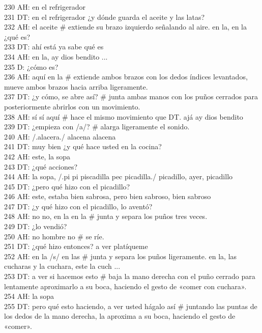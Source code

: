 230 AH: en el refrigerador\\
231 DT: en el refrigerador ¿y dónde guarda el aceite y las latas?\\
232 AH: el aceite \# extiende su brazo izquierdo señalando al aire. en la, en la ¿qué es?\\
233 DT: ahí está ya sabe qué es\\
234 AH: en la, ay dios bendito ...\\
235 D: ¿cómo es?\\
236 AH: aquí en la \# extiende ambos brazos con los dedos índices levantados, mueve ambos brazos hacia arriba ligeramente.\\
237 DT: ¿y cómo, se abre así? \# junta ambas manos con los puños cerrados para posteriormente abrirlos con un movimiento.\\
238 AH: sí sí aquí \# hace el mismo movimiento que DT. ajá ay dios bendito\\
239 DT: ¿empieza con /a/? \# alarga ligeramente el sonido.\\
240 AH: /.alacera./ alacena alacena\\
241 DT: muy bien ¿y qué hace usted en la cocina?\\
242 AH: este, la sopa\\
243 DT: ¿qué acciones?\\
244 AH: la sopa, /.pi pi piscadilla pec picadilla./ picadillo, ayer, picadillo\\
245 DT: ¿pero qué hizo con el picadillo?\\
246 AH: este, estaba bien sabrosa, pero bien sabroso, bien sabroso\\
247 DT: ¿y qué hizo con el picadillo, lo aventó?\\
248 AH: no no, en la en la \# junta y separa los puños tres veces.\\
249 DT: ¿lo vendió?\\
250 AH: no hombre no \# se ríe.\\
251 DT: ¿qué hizo entonces? a ver platíqueme\\
252 AH: en la /s/ en las \# junta y separa los puños ligeramente. en la, las cucharas y la cuchara, este la cuch ...\\
253 DT: a ver si hacemos esto \# baja la mano derecha con el puño cerrado para lentamente aproximarlo a su boca, haciendo el gesto de «comer con cuchara».\\
254 AH: la sopa\\
255 DT: pero qué esto haciendo, a ver usted hágalo así \# juntando las puntas de los dedos de la mano derecha, la aproxima a su boca, haciendo el gesto de «comer».\\
